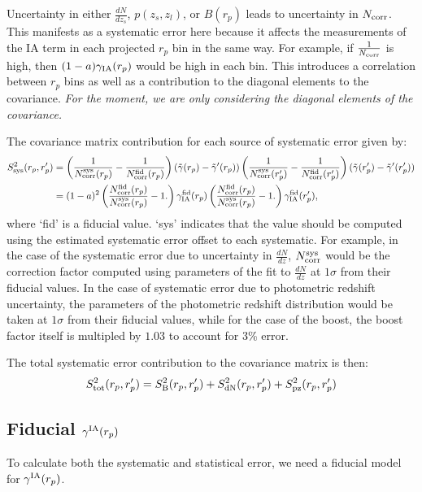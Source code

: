 \documentclass[onecolumn,amsmath,aps,fleqn, superscriptaddress]{revtex4}
\begin{document}
Uncertainty in either $\frac{dN}{dz_s}$, $p(z_s, z_l)$, or $B(r_p)$ leads to uncertainty in $N_{\rm corr}$. This manifests as a systematic error here because it affects the measurements of the IA term in each projected $r_p$ bin in the same way. For example, if $\frac{1}{N_{\rm corr}}$ is high, then $(1-a)\gamma_{\rm IA}(r_p)$ would be high in each bin. This introduces a correlation between $r_p$ bins as well as a contribution to the diagonal elements to the covariance. {\it For the moment, we are only considering the diagonal elements of the covariance.}

The covariance matrix contribution for each source of systematic error given by:
\begin{align}
S_{\rm sys}^2(r_p, r_p^\prime) &= \left(\frac{1}{N_{\rm corr}^{\rm sys}(r_p)} - \frac{1}{N_{\rm corr}^{\rm fid}(r_p)}\right)(\tilde{\gamma}(r_p) - \tilde{\gamma}^\prime(r_p))  \left(\frac{1}{N_{\rm corr}^{\rm sys}(r_p^\prime)} - \frac{1}{N_{\rm corr}^{\rm fid}(r_p^\prime)}\right)(\tilde{\gamma}(r_p^\prime) - \tilde{\gamma}^\prime(r_p^\prime)) \nonumber \\
& = (1-a)^2 \left(\frac{N_{\rm corr}^{\rm fid}(r_p)}{N_{\rm corr}^{\rm sys}(r_p)}-1.\right) \gamma_{\rm IA}^{\rm fid}(r_p) \left(\frac{N_{\rm corr}^{\rm fid}(r_p)}{N_{\rm corr}^{\rm sys}(r_p)}-1.\right)\gamma_{\rm IA}^{\rm fid}(r_p'),
\label{sys_general}
\end{align}
where `fid' is a fiducial value. `sys' indicates that the value should be computed using the estimated systematic error offset to each systematic. For example, in the case of the systematic error due to uncertainty in $\frac{dN}{dz}$, $N^{\rm sys}_{\rm corr}$ would be the correction factor computed using parameters of the fit to $\frac{dN}{dz}$ at $1\sigma$ from their fiducial values. In the case of systematic error due to photometric redshift uncertainty, the parameters of the photometric redshift distribution would be taken at $1\sigma$ from their fiducial values, while for the case of the boost, the boost factor itself is multipled by $1.03$ to account for 3\% error. 

The total systematic error contribution to the covariance matrix is then:
\begin{equation}
S_{\rm tot}^2(r_p, r_p^\prime) = S_{\rm B}^2(r_p, r_p^\prime) + S_{\rm dN}^2(r_p, r_p^\prime) + S_{\rm pz}^2(r_p, r_p^\prime)
\label{sysall}
\end{equation}

\subsection{Fiducial $\gamma^{\rm IA}(r_p)$}
To calculate both the systematic and statistical error, we need a fiducial model for $\gamma^{\rm IA}(r_p)$.
\end{document}

